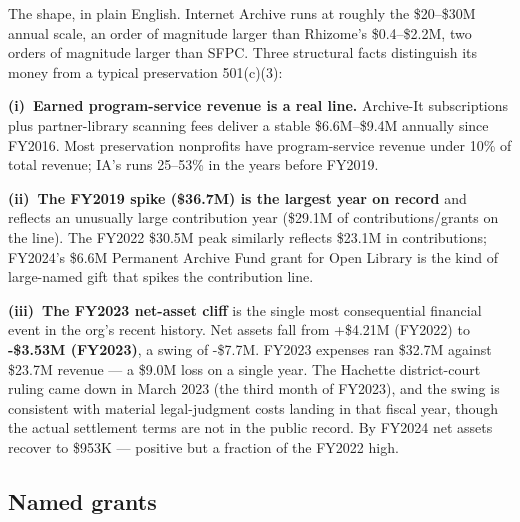 \documentclass[10pt,letterpaper,twocolumn]{article}
\begin{document}
The shape, in plain English. Internet Archive runs at roughly the \$20--\$30M annual scale, an order of magnitude larger than Rhizome's \$0.4--\$2.2M, two orders of magnitude larger than SFPC. Three structural facts distinguish its money from a typical preservation 501(c)(3):

\textbf{(i)~Earned program-service revenue is a real line.} Archive-It subscriptions plus partner-library scanning fees deliver a stable \$6.6M--\$9.4M annually since FY2016. Most preservation nonprofits have program-service revenue under 10\% of total revenue; IA's runs 25--53\% in the years before FY2019.

\textbf{(ii)~The FY2019 spike (\$36.7M) is the largest year on record} and reflects an unusually large contribution year (\$29.1M of contributions/grants on the line). The FY2022 \$30.5M peak similarly reflects \$23.1M in contributions; FY2024's \$6.6M Permanent Archive Fund grant for Open Library is the kind of large-named gift that spikes the contribution line.

\textbf{(iii)~The FY2023 net-asset cliff} is the single most consequential financial event in the org's recent history. Net assets fall from +\$4.21M (FY2022) to \textbf{-\$3.53M (FY2023)}, a swing of -\$7.7M. FY2023 expenses ran \$32.7M against \$23.7M revenue --- a \$9.0M loss on a single year. The Hachette district-court ruling came down in March 2023 (the third month of FY2023), and the swing is consistent with material legal-judgment costs landing in that fiscal year, though the actual settlement terms are not in the public record. By FY2024 net assets recover to \$953K --- positive but a fraction of the FY2022 high.

\subsection{Named grants}\label{sec:grants}
\end{document}
